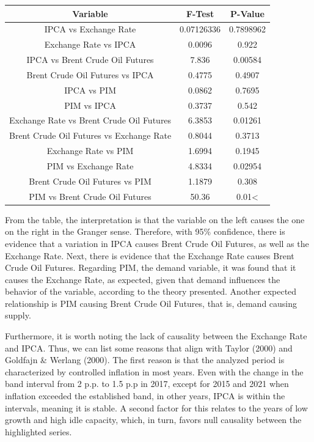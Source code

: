 \documentclass[12pt]{article}
\begin{document}
\begin{longtable}[]{@{}ccc@{}}
\toprule\noalign{}
Variable & F-Test & P-Value \\
\midrule\noalign{}
\endhead
\bottomrule\noalign{}
\endlastfoot
IPCA vs Exchange Rate & 0.07126336 & 0.7898962 \\
Exchange Rate vs IPCA & 0.0096 & 0.922 \\
IPCA vs Brent Crude Oil Futures & 7.836 & 0.00584 \\
Brent Crude Oil Futures vs IPCA & 0.4775 & 0.4907 \\
IPCA vs PIM & 0.0862 & 0.7695 \\
PIM vs IPCA & 0.3737 & 0.542 \\
Exchange Rate vs Brent Crude Oil Futures & 6.3853 & 0.01261 \\
Brent Crude Oil Futures vs Exchange Rate & 0.8044 & 0.3713 \\
Exchange Rate vs PIM & 1.6994 & 0.1945 \\
PIM vs Exchange Rate & 4.8334 & 0.02954 \\
Brent Crude Oil Futures vs PIM & 1.1879 & 0.308 \\
PIM vs Brent Crude Oil Futures & 50.36 & 0.01\textless{} \\
\end{longtable}

From the table, the interpretation is that the variable on the left
causes the one on the right in the Granger sense. Therefore, with 95\%
confidence, there is evidence that a variation in IPCA causes Brent
Crude Oil Futures, as well as the Exchange Rate. Next, there is evidence
that the Exchange Rate causes Brent Crude Oil Futures. Regarding PIM,
the demand variable, it was found that it causes the Exchange Rate, as
expected, given that demand influences the behavior of the variable,
according to the theory presented. Another expected relationship is PIM
causing Brent Crude Oil Futures, that is, demand causing supply.

Furthermore, it is worth noting the lack of causality between the
Exchange Rate and IPCA. Thus, we can list some reasons that align with
Taylor (2000) and Goldfajn \& Werlang (2000). The first reason is that
the analyzed period is characterized by controlled inflation in most
years. Even with the change in the band interval from 2 p.p. to 1.5 p.p
in 2017, except for 2015 and 2021 when inflation exceeded the
established band, in other years, IPCA is within the intervals, meaning
it is stable. A second factor for this relates to the years of low
growth and high idle capacity, which, in turn, favors null causality
between the highlighted series.
\end{document}

